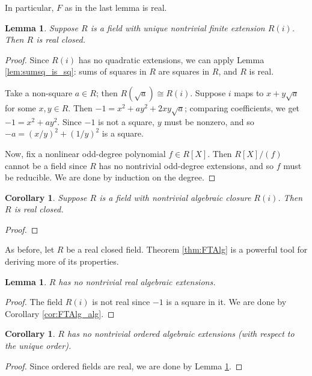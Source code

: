 \documentclass[a4paper]{report}
\newtheorem{lemma}[theorem]{Lemma}
\newtheorem{corollary}[theorem]{Corollary}
\theoremstyle{definition}
\begin{document}
In particular, $F$ as in the last lemma is real.

\begin{lemma}
  \label{lem:FTAlg_converse}
  Suppose $R$ is a field with unique nontrivial finite extension $R(i)$. Then $R$ is real closed.
\end{lemma}
\begin{proof}
  Since $R(i)$ has no quadratic extensions, we can apply Lemma \ref{lem:sumsq_is_sq}: sums of squares in $R$ are squares in $R$, and $R$ is real.

  Take a non-square $a\in R$; then $R(\sqrt{a})\cong R(i)$. Suppose $i$ maps to $x+y\sqrt{a}$ for some $x,y\in R$. Then $-1=x^2+ay^2+2xy\sqrt{a}$; comparing coefficients, we get $-1=x^2+ay^2$. Since $-1$ is not a square, $y$ must be nonzero, and so $-a=(x/y)^2+(1/y)^2$ is a square.

  Now, fix a nonlinear odd-degree polynomial $f\in R[X]$. Then $R[X]/(f)$ cannot be a field since $R$ has no nontrivial odd-degree extensions, and so $f$ must be reducible. We are done by induction on the degree.
\end{proof}

\begin{corollary}
  \label{lem:FTAlg_converse_alg_closure}
  Suppose $R$ is a field with nontrivial algebraic closure $R(i)$. Then $R$ is real closed.
\end{corollary}
\begin{proof}
\end{proof}

As before, let $R$ be a real closed field. Theorem \ref{thm:FTAlg} is a powerful tool for deriving more of its properties.

\begin{lemma}
  \label{lem:RCF_max}
  $R$ has no nontrivial real algebraic extensions.
\end{lemma}
\begin{proof}
  The field $R(i)$ is not real since $-1$ is a square in it. We are done by Corollary \ref{cor:FTAlg_alg}.
\end{proof}

\begin{corollary}
  \label{lem:RCF_max_ord}
  $R$ has no nontrivial ordered algebraic extensions (with respect to the unique order).
\end{corollary}
\begin{proof}
  Since ordered fields are real, we are done by Lemma \ref{lem:RCF_max}.
\end{proof}
\end{document}
